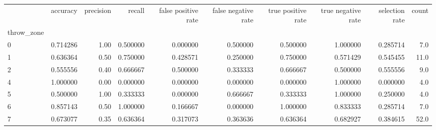 \begin{tabular}{lrrrrrrrrr}
\toprule
{} &  accuracy &  precision &    recall &  false positive rate &  false negative rate &  true positive rate &  true negative rate &  selection rate &  count \\
throw\_zone &           &            &           &                      &                      &                     &                     &                 &        \\
\midrule
0          &  0.714286 &       1.00 &  0.500000 &             0.000000 &             0.500000 &            0.500000 &            1.000000 &        0.285714 &    7.0 \\
1          &  0.636364 &       0.50 &  0.750000 &             0.428571 &             0.250000 &            0.750000 &            0.571429 &        0.545455 &   11.0 \\
2          &  0.555556 &       0.40 &  0.666667 &             0.500000 &             0.333333 &            0.666667 &            0.500000 &        0.555556 &    9.0 \\
4          &  1.000000 &       0.00 &  0.000000 &             0.000000 &             0.000000 &            0.000000 &            1.000000 &        0.000000 &    4.0 \\
5          &  0.500000 &       1.00 &  0.333333 &             0.000000 &             0.666667 &            0.333333 &            1.000000 &        0.250000 &    4.0 \\
6          &  0.857143 &       0.50 &  1.000000 &             0.166667 &             0.000000 &            1.000000 &            0.833333 &        0.285714 &    7.0 \\
7          &  0.673077 &       0.35 &  0.636364 &             0.317073 &             0.363636 &            0.636364 &            0.682927 &        0.384615 &   52.0 \\
\bottomrule
\end{tabular}
